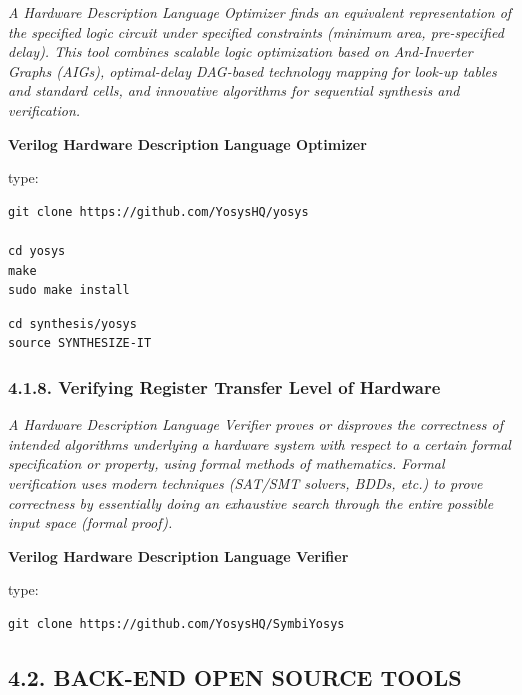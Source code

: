 \documentclass[
]{article}
\begin{document}
\emph{A Hardware Description Language Optimizer finds an equivalent
representation of the specified logic circuit under specified
constraints (minimum area, pre-specified delay). This tool combines
scalable logic optimization based on And-Inverter Graphs (AIGs),
optimal-delay DAG-based technology mapping for look-up tables and
standard cells, and innovative algorithms for sequential synthesis and
verification.}

\textbf{Verilog Hardware Description Language Optimizer}

type:

\begin{verbatim}
git clone https://github.com/YosysHQ/yosys

cd yosys
make
sudo make install
\end{verbatim}

\begin{verbatim}
cd synthesis/yosys
source SYNTHESIZE-IT
\end{verbatim}

\hypertarget{verifying-register-transfer-level-of-hardware}{%
\subsubsection{4.1.8. Verifying Register Transfer Level of
Hardware}\label{verifying-register-transfer-level-of-hardware}}

\emph{A Hardware Description Language Verifier proves or disproves the
correctness of intended algorithms underlying a hardware system with
respect to a certain formal specification or property, using formal
methods of mathematics. Formal verification uses modern techniques
(SAT/SMT solvers, BDDs, etc.) to prove correctness by essentially doing
an exhaustive search through the entire possible input space (formal
proof).}

\textbf{Verilog Hardware Description Language Verifier}

type:

\begin{verbatim}
git clone https://github.com/YosysHQ/SymbiYosys
\end{verbatim}

\hypertarget{back-end-open-source-tools}{%
\subsection{4.2. BACK-END OPEN SOURCE
TOOLS}\label{back-end-open-source-tools}}
\end{document}
